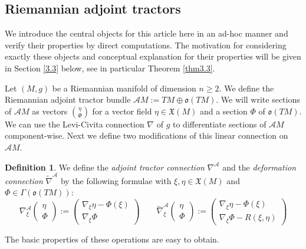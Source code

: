 \documentclass[12pt,a4paper]{amsart}
\def\frak{\mathfrak}
\def\Cal{\mathcal}
\newcommand{\Ga}{\Gamma}
\newcommand{\Ph}{\Phi}
\newcommand{\tn}{\widetilde{\nabla}}
\newcounter{theorem}
\numberwithin{theorem}{section}
\numberwithin{equation}{section}
\theoremstyle{definition}
\newtheorem{definition}[theorem]{Definition}
\theoremstyle{remark}
\begin{document}
\subsection{Riemannian adjoint tractors}\label{2.2}
We introduce the central objects for this article here in an ad-hoc manner and verify
their properties by direct computations. The motivation for considering exactly these
objects and conceptual explanation for their properties will be given in Section
\ref{3.3} below, see in particular Theorem \ref{thm3.3}.

Let $(M,g)$ be a Riemannian manifold of dimension $n\geq 2$. We define the Riemannian
adjoint tractor bundle $\Cal AM:=TM\oplus\frak o(TM)$. We will write sections of
$\Cal AM$ as vectors $\binom{\eta}{\Phi}$ for a vector field $\eta\in\frak X(M)$ and
a section $\Ph$ of $\frak o(TM)$. We can use the Levi-Civita connection $\nabla$ of
$g$ to differentiate sections of $\Cal AM$ component-wise. Next we define two
modifications of this linear connection on $\Cal AM$.

\begin{definition}\label{def2.2}
We define the \textit{adjoint tractor connection} $\nabla^{\Cal A}$ and the
\textit{deformation connection} $\tn^{\Cal A}$ by the following formulae with
$\xi,\eta\in\frak X(M)$ and $\Phi\in\Ga(\frak o(TM))$:
\begin{equation}\label{conn-def}
\nabla^{\Cal A}_\xi\begin{pmatrix} \eta\\ \Phi \end{pmatrix}:=\begin{pmatrix}
\nabla_\xi\eta-\Phi(\xi)\\ \nabla_\xi\Phi \end{pmatrix} \qquad 
\tn^{\Cal A}_\xi\begin{pmatrix} \eta\\ \Phi \end{pmatrix}:=\begin{pmatrix}
\nabla_\xi\eta-\Phi(\xi)\\ \nabla_\xi\Phi-R(\xi,\eta) \end{pmatrix}
\end{equation}
\end{definition}

The basic properties of these operations are easy to obtain.
\end{document}

